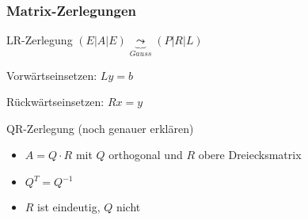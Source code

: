 \subsubsection{Matrix-Zerlegungen}

\begin{KR}{LR-Zerlegung}
    $(E | A | E) \underbrace{\leadsto}_{Gauss} (P | R | L)$
    
    Vorwärtseinsetzen: $Ly = b$
    
    Rückwärtseinsetzen: $Rx = y$
\end{KR}

\begin{KR}{QR-Zerlegung} (noch genauer erklären)
    \begin{itemize}
        \item $A = Q \cdot R$ mit $Q$ orthogonal und $R$ obere Dreiecksmatrix
        \item $Q^T = Q^{-1}$
        \item $R$ ist eindeutig, $Q$ nicht
    \end{itemize}
\end{KR}

































